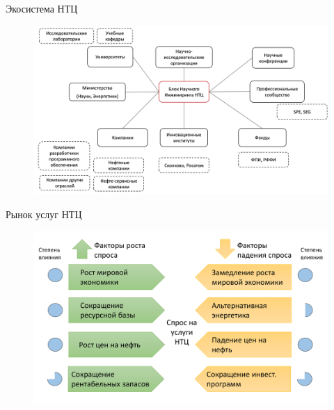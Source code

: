 \documentclass{beamer}
\begin{document}
\begin{frame}{Экосистема НТЦ}
	\begin{figure}
		\includegraphics[width=\textwidth]{media/eco.png}
	\end{figure}
\end{frame}


\begin{frame}{Рынок услуг НТЦ}
\begin{figure}
	\includegraphics[width=\textwidth]{media/sANDd.png}
\end{figure}
\end{frame}
\end{document}
